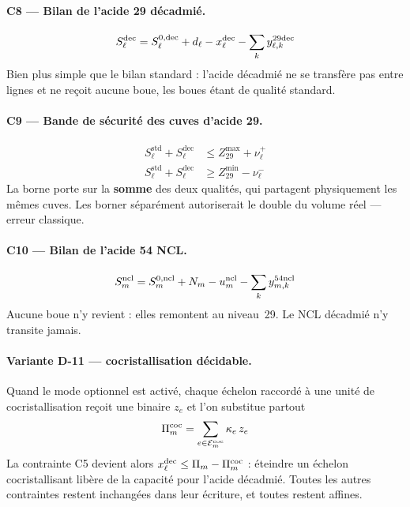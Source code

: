 \paragraph{C8 --- Bilan de l'acide 29 décadmié.}
\begin{equation}
S^{\mathrm{dec}}_\ell = S^{0,\mathrm{dec}}_\ell + d_\ell - x^{\mathrm{dec}}_\ell
- \sum_{k} y^{\text{29dec}}_{\ell,k}
\end{equation}
Bien plus simple que le bilan standard : l'acide décadmié ne se transfère pas entre lignes
et ne reçoit aucune boue, les boues étant de qualité standard.

\paragraph{C9 --- Bande de sécurité des cuves d'acide 29.}
\begin{align}
S^{\mathrm{std}}_\ell + S^{\mathrm{dec}}_\ell &\le Z^{\max}_{29} + \nu^{+}_{\ell} \\
S^{\mathrm{std}}_\ell + S^{\mathrm{dec}}_\ell &\ge Z^{\min}_{29} - \nu^{-}_{\ell}
\end{align}
La borne porte sur la \textbf{somme} des deux qualités, qui partagent physiquement les mêmes
cuves. Les borner séparément autoriserait le double du volume réel --- erreur classique.

\paragraph{C10 --- Bilan de l'acide 54 NCL.}
\begin{equation}
S^{\mathrm{ncl}}_m = S^{0,\mathrm{ncl}}_m + N_m - u^{\mathrm{ncl}}_m - \sum_{k} y^{\text{54ncl}}_{m,k}
\end{equation}
Aucune boue n'y revient : elles remontent au niveau~29. Le NCL décadmié n'y transite jamais.

\paragraph{Variante D-11 --- cocristallisation décidable.}
Quand le mode optionnel est activé, chaque échelon raccordé à une unité de cocristallisation
reçoit une binaire $z_e$ et l'on substitue partout
\begin{equation}
\Pi^{\mathrm{coc}}_m = \sum_{e \in \mathcal{E}^{\mathrm{coc}}_m} \kappa_e\, z_e
\end{equation}
La contrainte C5 devient alors $x^{\mathrm{dec}}_\ell \le \Pi_m - \Pi^{\mathrm{coc}}_m$ : éteindre un échelon
cocristallisant libère de la capacité pour l'acide décadmié. Toutes les autres contraintes
restent inchangées dans leur écriture, et toutes restent affines.

